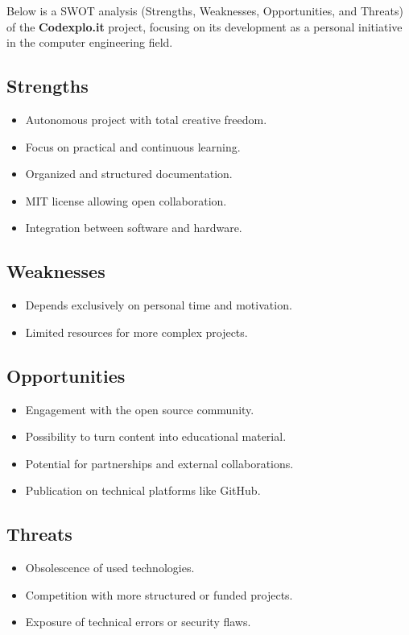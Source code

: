 \documentclass[10pt, a4paper, oneside]{article}
\begin{document}
Below is a SWOT analysis (Strengths, Weaknesses, Opportunities, and Threats) of the \textbf{Codexplo.it} project, focusing on its development as a personal initiative in the computer engineering field.

\subsection*{Strengths}
\begin{itemize}
  \item Autonomous project with total creative freedom.
  \item Focus on practical and continuous learning.
  \item Organized and structured documentation.
  \item MIT license allowing open collaboration.
  \item Integration between software and hardware.
\end{itemize}

\subsection*{Weaknesses}
\begin{itemize}
  \item Depends exclusively on personal time and motivation.
  \item Limited resources for more complex projects.
\end{itemize}

\subsection*{Opportunities}
\begin{itemize}
  \item Engagement with the open source community.
  \item Possibility to turn content into educational material.
  \item Potential for partnerships and external collaborations.
  \item Publication on technical platforms like GitHub.
\end{itemize}

\subsection*{Threats}
\begin{itemize}
  \item Obsolescence of used technologies.
  \item Competition with more structured or funded projects.
  \item Exposure of technical errors or security flaws.
\end{itemize}
\end{document}
